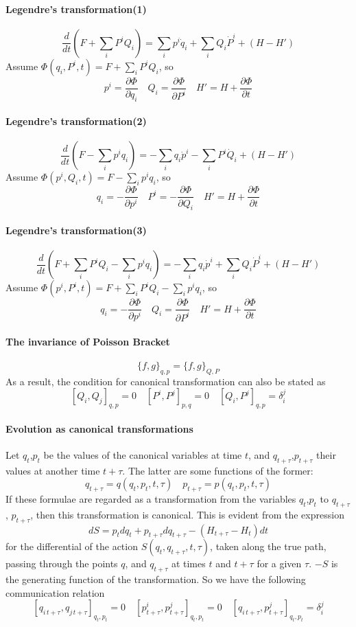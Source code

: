 \documentclass{article}
\begin{document}
\paragraph{Legendre's transformation(1)}
\[\frac{d}{dt}(F+\sum_i P^i Q_i) = \sum_i p^i \dot{q}_i + \sum_i Q_i \dot{P}^i + (H-H')\]
Assume $\Phi(q_i,P^i,t) = F + \sum_i P^i Q_i$, so
\[p^i = \frac{\partial \Phi}{\partial q_i} \quad Q_i = \frac{\partial \Phi}{\partial P^i} \quad H' = H + \frac{\partial \Phi}{\partial t}\]
\paragraph{Legendre's transformation(2)}
\[\frac{d}{dt}(F-\sum_i p^i q_i) = -\sum_i q_i \dot{p}^i - \sum_i P^i \dot{Q}_i + (H-H')\]
Assume $\Phi(p^i,Q_i,t) = F - \sum_i p^i q_i$, so
\[q_i = -\frac{\partial \Phi}{\partial p^i} \quad P^i = -\frac{\partial \Phi}{\partial Q_i} \quad H' = H + \frac{\partial \Phi}{\partial t}\]
\paragraph{Legendre's transformation(3)}
\[\frac{d}{dt}(F+\sum_i P^i Q_i-\sum_i p^i q_i) = -\sum_i q_i \dot{p}^i + \sum_i Q_i \dot{P}^i + (H-H')\]
Assume $\Phi(p^i,P^i,t) = F+\sum_i P^i Q_i-\sum_i p^i q_i$, so
\[q_i = -\frac{\partial \Phi}{\partial p^i} \quad Q_i = \frac{\partial \Phi}{\partial P^i} \quad H' = H + \frac{\partial \Phi}{\partial t}\]
\paragraph{The invariance of Poisson Bracket}
\[\{f,g\}_{q,p} = \{f,g\}_{Q,P}\]
As a result, the condition for canonical transformation can also be stated as
\[[Q_i,Q_j]_{q,p} = 0 \quad [P^i,P^j]_{p,q} = 0 \quad [Q_i,P^j]_{q,p} = \delta_i^j\]
\paragraph{Evolution as canonical transformations}
Let $q_t$,$p_t$ be the values of the canonical variables at time $t$, and $q_{t+\tau}$,$p_{t+\tau}$ their values at another time $t+\tau$. The latter are some functions of the former:
\[q_{t+\tau} = q(q_t,p_t,t,\tau) \quad p_{t+\tau} = p(q_t,p_t,t,\tau)\]
If these formulae are regarded as a transformation from the variables $q_t$,$p_t$ to $q_{t+\tau}$, $p_{t+\tau}$, then this transformation is canonical. This is evident from the
expression
\[dS = p_t dq_t + p_{t+\tau} dq_{t+\tau} -(H_{t+\tau}-H_t)dt\]
for the differential of the action $S(q_t,q_{t+\tau},t,\tau)$, taken along the true path, passing through the points $q$, and $q_{t+\tau}$ at times $t$ and $t+\tau$ for a given $\tau$. $-S$ is the generating function of the transformation. So we have the following communication relation
\[[q_{i\,t+\tau},q_{j\,t+\tau}]_{q_t,p_t} = 0 \quad [p^i_{t+\tau},p^j_{t+\tau}]_{q_t,p_t} = 0 \quad [q_{i\,t+\tau},p^j_{t+\tau}]_{q_t,p_t} = \delta_i^j\]
\end{document}
